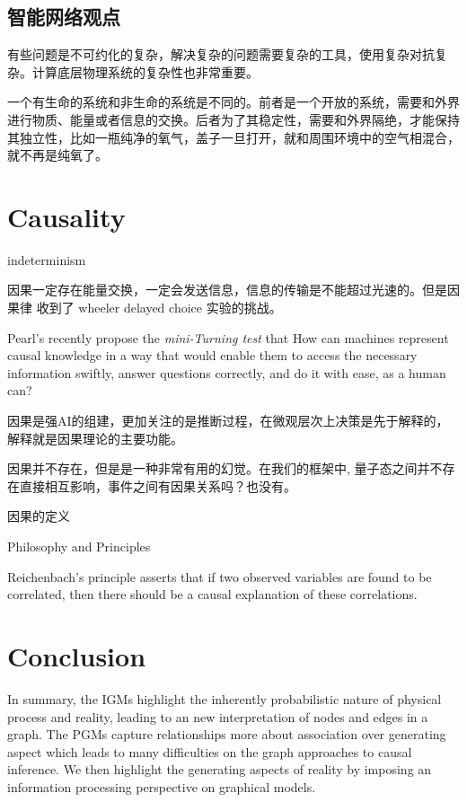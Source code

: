 \documentclass{article}
\theoremstyle{definition}
\theoremstyle{remark}
\theoremstyle{definition}
\begin{document}
\begin{CJK*}{UTF8}{gbsn}
\subsection{智能网络观点}

有些问题是不可约化的复杂，解决复杂的问题需要复杂的工具，使用复杂对抗复杂。计算底层物理系统的复杂性也非常重要。

一个有生命的系统和非生命的系统是不同的。前者是一个开放的系统，需要和外界进行物质、能量或者信息的交换。后者为了其稳定性，需要和外界隔绝，才能保持其独立性，比如一瓶纯净的氧气，盖子一旦打开，就和周围环境中的空气相混合，就不再是纯氧了。

\section{Causality}

indeterminism


因果一定存在能量交换，一定会发送信息，信息的传输是不能超过光速的。但是因果律 收到了 wheeler delayed choice 实验的挑战。


Pearl's recently propose the \emph{mini-Turning test} that  How can machines represent causal knowledge in a way that would enable them to access the necessary information swiftly, answer questions correctly, and do it with ease, as a human can? 

因果是强AI的组建，更加关注的是推断过程，在微观层次上决策是先于解释的，解释就是因果理论的主要功能。


因果并不存在，但是是一种非常有用的幻觉。在我们的框架中, 量子态之间并不存在直接相互影响，事件之间有因果关系吗？也没有。

因果的定义

{Philosophy and Principles}

Reichenbach's principle asserts that if two observed variables are found to be correlated, then there should be a causal explanation of these correlations. 


\section{Conclusion}

In summary, the IGMs highlight the inherently probabilistic nature of physical process and reality, leading to an new interpretation of nodes and edges in a graph. The PGMs capture relationships more about association over generating aspect which leads to many difficulties on the graph approaches to causal inference. We then highlight the generating aspects of reality by imposing an information processing perspective on graphical models.


\end{CJK*}
\end{document}
